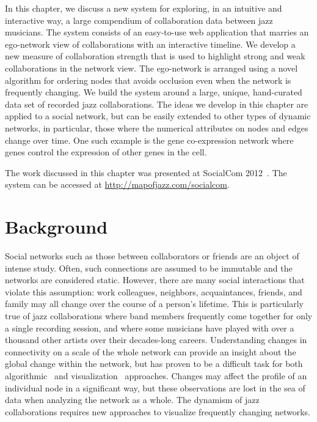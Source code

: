 \documentclass[12pt]{cmuthesis}
\begin{document}
In this chapter, we discuss a new system for exploring, in an intuitive and interactive way, a large compendium of collaboration data between jazz musicians. The system consists of an easy-to-use web application that marries an ego-network view of collaborations with an interactive timeline.  We develop a new measure of collaboration strength that is used to highlight strong and weak collaborations in the network view. The ego-network is arranged using a novel algorithm for ordering nodes that avoids occlusion even when the network is frequently changing. We build the system around a large, unique, hand-curated data set of recorded jazz collaborations. The ideas we develop in this chapter are applied to a social network, but can be easily extended to other types of dynamic networks, in particular, those where the numerical attributes on nodes and edges change over time. One such example is the gene co-expression network where genes control the expression of other genes in the cell.

The work discussed in this chapter was presented at SocialCom 2012~\cite{Filippova2012moj}. The system can be accessed at \url{http://mapofjazz.com/socialcom}.

\section{Background}

  Social networks such as those between collaborators or friends are an object of intense study. Often, such connections are assumed to be immutable and the networks are considered static. However, there are many social interactions that violate this assumption: work colleagues, neighbors, acquaintances, friends, and family may all change over the course of a person's lifetime. This is particularly true of jazz collaborations where band members frequently come together for only a single recording session, and where some musicians have played with over a thousand other artists over their decades-long careers. Understanding changes in connectivity on a scale of the whole network can provide an insight about the global change within the network, but has proven to be a difficult task for both algorithmic~\cite{Hopcroft2004, Palla2005c, Tantipathananandh2007, TangLiuZhna08} and visualization~\cite{BenderDeMoll2006, Rosvall2010,Yi2010} approaches. Changes may affect the profile of an individual node in a significant way, but these observations are lost in the sea of data when analyzing the network as a whole. The dynamism of jazz collaborations requires new approaches to visualize frequently changing networks.
\end{document}
